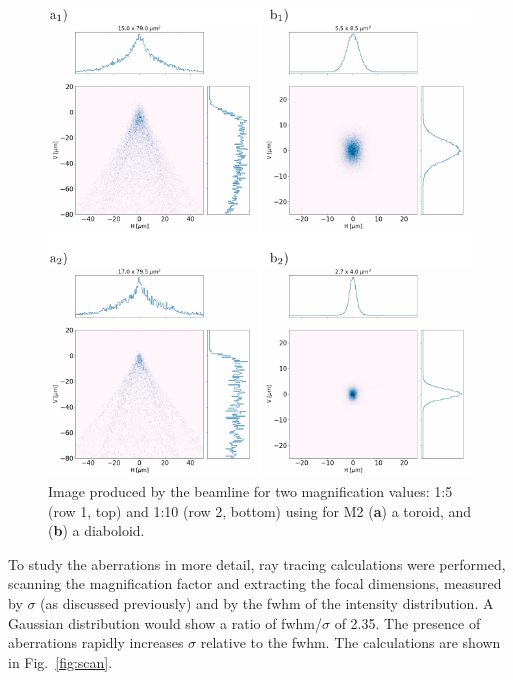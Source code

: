 \documentclass{iucr}       %
\begin{document}
\begin{figure}\label{fig:demagnification}
\includegraphics[width=1.0\textwidth]{figures/fig5.pdf}
% 
% 
\caption{Image produced by the beamline for two magnification values: 1:5 (row 1, top) and 1:10 (row 2, bottom) using for M2 (\textbf{a}) a toroid, and (\textbf{b}) a diaboloid.}
\end{figure}

To study the aberrations in more detail, ray tracing calculations were performed, scanning the magnification factor and extracting the focal dimensions, measured by $\sigma$ (as discussed previously) and by the fwhm of the intensity distribution. A Gaussian distribution would show a ratio of fwhm/$\sigma$ of 2.35. The presence of aberrations rapidly increases $\sigma$ relative to the fwhm. The calculations are shown in Fig.~\ref{fig:scan}.
\end{document}
